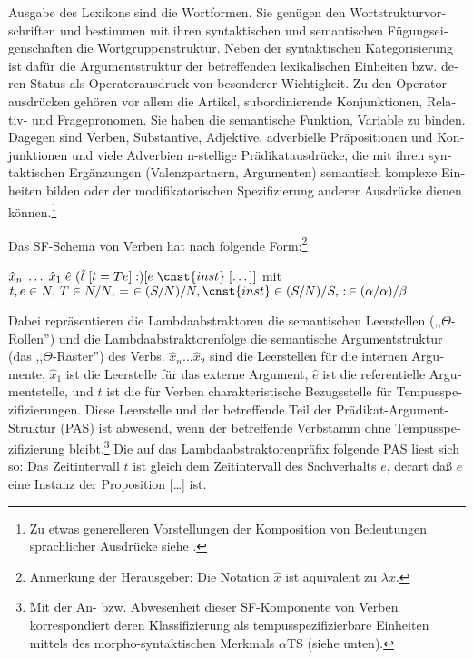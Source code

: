 \documentclass[output=paper,colorlinks,citecolor=brown, booklanguage=german]{langscibook}
\begin{document}
\begin{otherlanguage}{german}
Ausgabe des Lexikons sind die Wortformen. Sie genügen den Wortstrukturvorschriften und bestimmen mit ihren syntaktischen und semantischen Fügungseigenschaften die Wortgruppenstruktur. Neben der syntaktischen Kategorisierung ist dafür die Argumentstruktur der betreffenden lexikalischen Einheiten bzw. deren Status als Operatorausdruck von besonderer Wichtigkeit. Zu den Operatorausdrücken gehören vor allem die Artikel, subordinierende Konjunktionen, Relativ- und Fragepronomen. Sie haben die semantische Funktion, Variable zu binden. Dagegen sind Verben, Substantive, Adjektive, adverbielle Präpositionen und Konjunktionen und viele Adverbien n-stellige Prädikatausdrücke, die mit ihren syntaktischen Ergänzungen (Valenzpartnern, Argumenten) semantisch komplexe Einheiten bilden oder der modifikatorischen Spezifizierung anderer Ausdrücke dienen können.\footnote{Zu etwas generelleren Vorstellungen der Komposition von Bedeutungen sprachlicher Ausdrücke siehe \citet{Fanselow1985,Fanselow1986b,Fanselow1986a,Fanselow1988}.}

Das SF-Schema von Verben hat nach \citet{Bierwisch1987d} folgende Form:\footnote{Anmerkung der Herausgeber: Die Notation $\hat{x}$  ist äquivalent zu $\lambda x$.}


\ea\label{ex:zi88:1} $\hat{x}_n \; \dots \; \hat{x}_1 \; \hat{e} \,\, (\hat{t} \; [t = Te]:) [e\; \cnst{inst} \; [\dots ]]$ \newline
mit $t,e \in N, \,T \in N/N, \, = \, \, \in (S/N)/N, \cnst{inst} \in (S/N)/S, \, : \, \in (\alpha/\alpha)/\beta$
\z

\noindent Dabei repräsentieren die Lambdaabstraktoren die semantischen Leerstellen (,,$\Theta$-Rollen'') und die Lambdaabstraktorenfolge die semantische Argumentstruktur (das ,,$\Theta$-Raster'') des Verbs. $\hat{x}_n \dots \hat{x}_2$ sind die Leerstellen für die internen Argumente, $\hat{x}_1$ ist die Leerstelle für das externe Argument, $\hat{e}$ ist die referentielle Argumentstelle, und $\hat{t}$ ist die für Verben charakteristische Bezugsstelle für Tempusspezifizierungen. Diese Leerstelle und der betreffende Teil der Prädikat-Argument-Struktur (PAS) ist abwesend, wenn der betreffende Verbstamm ohne Tempusspezifizierung bleibt.\footnote{Mit der An- bzw. Abwesenheit dieser SF-Komponente von Verben korrespondiert deren Klassifizierung als tempusspezifizierbare Einheiten mittels des morpho-syntaktischen Merkmals $\alpha$TS (siehe unten).} Die auf das Lambdaabstraktorenpräfix folgende PAS liest sich so: Das Zeitintervall $t$ ist gleich dem Zeitintervall des Sachverhalts $e$, derart daß $e$ eine Instanz der Proposition [\dots] ist.


\end{otherlanguage}
\end{document}
